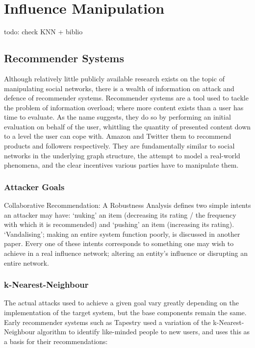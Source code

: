 \section{Influence Manipulation}

todo: check KNN + biblio

\subsection{Recommender Systems}

Although relatively little publicly available research exists on the topic of manipulating social networks, there is a wealth of information on attack and defence of recommender systems. Recommender systems are a tool used to tackle the problem of information overload; where more content exists than a user has time to evaluate. As the name suggests, they do so by performing an initial evaluation on behalf of the user, whittling the quantity of presented content down to a level the user can cope with. Amazon and Twitter them to recommend products and followers respectively. They are fundamentally similar to social networks in the underlying graph structure, the attempt to model a real-world phenomena, and the clear incentives various parties have to manipulate them.

\subsubsection{Attacker Goals}

Collaborative Recommendation: A Robustness Analysis defines two simple intents an attacker may have: `nuking' an item (decreasing its rating / the frequency with which it is recommended) and `pushing' an item (increasing its rating). `Vandalising'; making an entire system function poorly, is discussed in another paper. Every one of these intents corresponds to something one may wish to achieve in a real influence network; altering an entity's influence or disrupting an entire network.

\subsubsection{k-Nearest-Neighbour}

The actual attacks used to achieve a given goal vary greatly depending on the implementation of the target system, but the base components remain the same. Early recommender systems such as Tapestry used a variation of the k-Nearest-Neighbour algorithm to identify like-minded people to new users, and uses this as a basis for their recommendations:  

